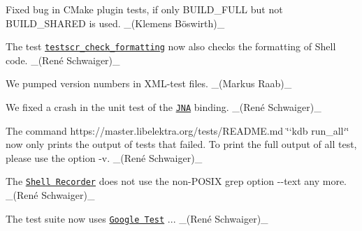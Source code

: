 \begin{DoxyItemize}
\item Fixed bug in C\+Make plugin tests, if only {\ttfamily B\+U\+I\+L\+D\+\_\+\+F\+U\+LL} but not {\ttfamily B\+U\+I\+L\+D\+\_\+\+S\+H\+A\+R\+ED} is used. \+\_\+(Klemens Böswirth)\+\_\+
\item The test \href{https://master.libelektra.org/tests/shell/check_formatting.sh}{\tt {\ttfamily testscr\+\_\+check\+\_\+formatting}} now also checks the formatting of Shell code. \+\_\+(René Schwaiger)\+\_\+
\item We pumped version numbers in X\+M\+L-\/test files. \+\_\+(\+Markus Raab)\+\_\+
\item We fixed a crash in the unit test of the \href{https://www.libelektra.org/bindings/jna}{\tt J\+NA} binding. \+\_\+(René Schwaiger)\+\_\+
\item The command https\+://master.libelektra.\+org/tests/\+R\+E\+A\+D\+ME.md \char`\"{}`kdb run\+\_\+all`\char`\"{} now only prints the output of tests that failed. To print the full output of all test, please use the option {\ttfamily -\/v}. \+\_\+(René Schwaiger)\+\_\+
\item The \href{https://master.libelektra.org/tests/shell/shell_recorder}{\tt Shell Recorder} does not use the non-\/\+P\+O\+S\+IX grep option {\ttfamily -\/-\/text} any more. \+\_\+(René Schwaiger)\+\_\+
\item The test suite now uses \href{https://github.com/google/googletest}{\tt Google Test} {..}. \+\_\+(René Schwaiger)\+\_\+
\end{DoxyItemize}


